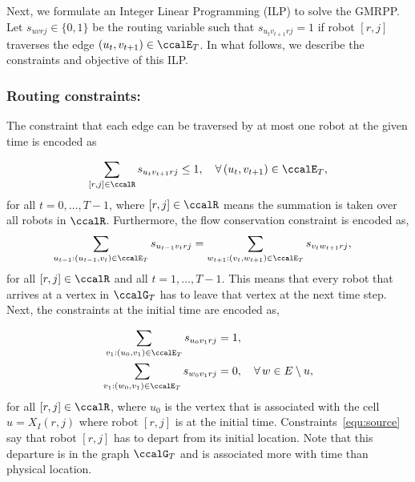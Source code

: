 \documentclass[Afour,sageh,times]{sagej}
\begin{document}
{{{Next, we formulate an Integer Linear Programming (ILP) to solve the GMRPP. Let $s_{uvrj} \in\{0,1\}$ be the routing variable such that $s_{u_{t}v_{t+1}rj} = 1$ if robot $[r,j]$ traverses the edge $(u_t,v_{t+1}) \in \ccalE_T$. In what follows, we describe the constraints and objective of this ILP.


\subsubsection{Routing constraints:}
The constraint that each edge can be traversed by at most one robot at the given time is encoded as}
\begingroup\makeatletter{}\check@mathfonts
\def\maketag@@@#1{\hbox{\m@th\normalsize\normalfont#1}}%
\begin{align}
  \sum_{[r,j] \in \ccalR} s_{u_t v_{t+1}rj} \leq 1, \quad \forall \,(u_t,v_{t+1}) \in \ccalE_T,
\end{align}
\endgroup
for all $t=0,\ldots, T-1$, where $[r,j]\in\ccalR$ means the summation is taken over all robots in $\ccalR$. Furthermore, the flow conservation constraint is encoded as,
\begingroup\makeatletter\def\f@size{10}\check@mathfonts
\def\maketag@@@#1{\hbox{\m@th\normalsize\normalfont#1}}%
\begingroup
  \begin{align}\label{equ:flow}
  \sum_{u_{t-1}:(u_{t-1}, v_t) \in \ccalE_T}   s_{u_{t-1} v_t rj} &  =   \sum_{w_{t+1}:(v_t, w_{t+1}) \in \ccalE_T} s_{v_t w_{t+1} rj},
  \end{align}
\endgroup
for all $[r,j]\in \ccalR$ and all $t=1,\ldots,T-1$. This means that every robot that arrives at a vertex in $\ccalG_T$ has to leave that vertex at the next time step. Next, the constraints at the initial time are encoded as,
\begingroup\makeatletter\def\f@size{10}\check@mathfonts
\def\maketag@@@#1{\hbox{\m@th\normalsize\normalfont#1}}%
\begingroup

\begin{subequations}\label{equ:source}
  \begin{align}
    \sum_{v_1:(u_0, v_1) \in \ccalE_T} s_{u_0v_1 rj} &  = 1,  \\
    \sum_{v_1:(w_0, v_1) \in \ccalE_T} s_{w_0v_1 rj} & = 0, \quad \forall\, w \in E\setminus u,
  \end{align}
\end{subequations}
\endgroup
for all $[r,j]\in \ccalR$, where $u_0$ is the vertex that is associated with the cell $u = X_I(r,j)$ where robot $[r,j]$ is at the initial time. Constraints~\eqref{equ:source} say that robot $[r,j]$ has to depart from its initial location. Note that this departure is in the graph $\ccalG_T$ and is associated more with time than physical location.

}}
\end{document}
